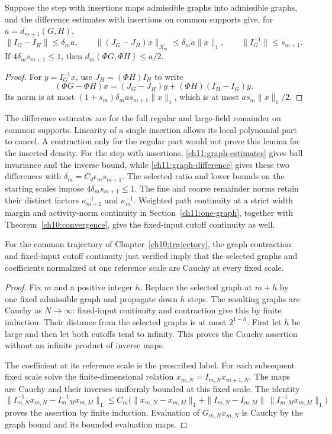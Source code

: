 \begin{lemma}
\label{ch12:contraction}
Suppose the step with insertions maps admissible graphs into admissible graphs,
and the difference estimates with insertions on common supports give, for
$a=d_{m+1}(G,H)$,
\[
 \|I_G-I_H\|\le\delta_m a,\qquad
 \|(J_G-J_H)x\|_{\mathcal R_m}\le\delta_m a\|x\|_1,
 \qquad \|I_G^{-1}\|\le s_{m+1}.
\]
If $4\delta_m s_{m+1}\le1$, then
$d_m(\Phi G,\Phi H)\le a/2$.
\end{lemma}
\begin{proof}
For $y=I_G^{-1}x$, use $J_H=(\Phi H)I_H$ to write
\[
 (\Phi G-\Phi H)x=(J_G-J_H)y+(\Phi H)(I_H-I_G)y.
\]
Its norm is at most $(1+s_m)\delta_m a s_{m+1}\|x\|_1$,
which is at most $as_m\|x\|_1/2$.
\end{proof}
The difference estimates are for the full regular and large-field
remainder on common supports. Linearity of a single insertion
allows its local polynomial part to cancel. A contraction only for the regular
part would not prove this lemma for the inserted density.
For the step with insertions, \eqref{ch11:graph-estimates} gives
ball invariance and the inverse bound, while
\eqref{ch11:graph-difference} gives these two differences with
$\delta_m=C_d\epsilon_m s_{m+1}$.
The selected ratio and lower bounds on the starting scales impose
$4\delta_m s_{m+1}\le1$. The fine and coarse remainder norms retain
their distinct factors $\kappa_{m+1}^{-1}$ and $\kappa_m^{-1}$.
Weighted path continuity at a strict width margin and activity-norm
continuity in Section~\ref{ch11:one-graph}, together with
Theorem~\ref{ch10:convergence}, give the fixed-input cutoff
continuity as well.

\begin{proposition}
\label{ch12:forgetting}
For the common trajectory of Chapter~\ref{ch10:trajectory}, the graph contraction and fixed-input
cutoff continuity just verified imply that the selected
graphs and coefficients normalized at one reference scale are Cauchy
at every fixed scale.
\end{proposition}
\begin{proof}
Fix $m$ and a positive integer $h$. Replace the selected graph at
$m+h$ by one fixed admissible graph and propagate down $h$ steps.
The resulting graphs are Cauchy as $N\to\infty$: fixed-input
continuity and contraction give this by finite induction. Their
distance from the selected graphs is at most $2^{1-h}$. First let $h$
be large and then let both cutoffs tend to infinity. This proves the
Cauchy assertion without an infinite product of inverse maps.

The coefficient at its reference scale is the prescribed label.
For each subsequent fixed scale solve the finite-dimensional relation
$x_{m,N}=I_{m,N}x_{m+1,N}$. The maps are Cauchy and their inverses
uniformly bounded at this fixed scale. The identity
\[
 \|I_{m,N}^{-1}x_{m,N}-I_{m,M}^{-1}x_{m,M}\|_1
 \le C_m\bigl(\|x_{m,N}-x_{m,M}\|_1
       +\|I_{m,N}-I_{m,M}\|\,\|I_{m,M}^{-1}x_{m,M}\|_1\bigr)
\]
proves the assertion by finite induction. Evaluation of $G_{m,N}x_{m,N}$
is Cauchy by the graph bound and its bounded evaluation maps.
\end{proof}


